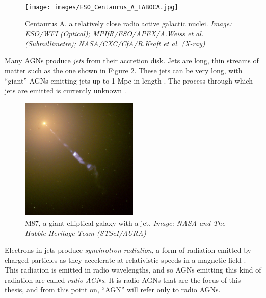         \begin{figure}[!ht]
            \centering
            \texttt{[image: images/ESO\_Centaurus\_A\_LABOCA.jpg]}
            \caption{Centaurus A, a relatively close radio active galactic nuclei. \emph{Image: ESO/WFI (Optical); MPIfR/ESO/APEX/A.Weiss et al. (Submillimetre); NASA/CXC/CfA/R.Kraft et al. (X-ray)}}
            \label{fig:centaurus-a}
        \end{figure}

        Many AGNs produce \emph{jets} from their accretion disk. Jets are long, thin streams of matter such as the one shown in Figure \ref{fig:m87}. These jets can be very long, with ``giant'' AGNs emitting jets up to 1 Mpc in length . The process through which jets are emitted is currently unknown .

        \begin{figure}[!ht]
            \centering
            \includegraphics[width=0.5\textwidth]{images/M87_jet.jpg}
            \caption{M87, a giant elliptical galaxy with a jet. \emph{Image: NASA and The Hubble Heritage Team (STScI/AURA)}}
            \label{fig:m87}
        \end{figure}

        Electrons in jets produce \emph{synchrotron radiation}, a form of radiation emitted by charged particles as they accelerate at relativistic speeds in a magnetic field . This radiation is emitted in radio wavelengths, and so AGNs emitting this kind of radiation are called \emph{radio AGNs}. It is radio AGNs that are the focus of this thesis, and from this point on, ``AGN'' will refer only to radio AGNs.


